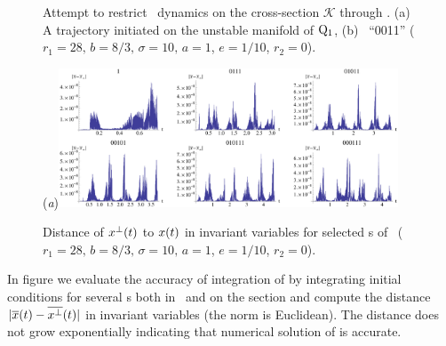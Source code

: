 {\begin{figure}[ht]
\begin{center}
\end{center}
\caption[\CLe\ desymmetrization with transverse integration]{
Attempt to restrict \CLe\ dynamics on the cross-section $\mathcal{K}$ through
. (a) A trajectory initiated on the unstable
manifold of $\mathrm{Q}_{1}$, (b) \rpo\ ``0011''
($r_1=28,\, b=8/3,\, \sigma=10,\, a=1$, $e=1/10$, $r_2=0$).
    }
\label{fig:CLEtransv}
\end{figure}

\begin{figure}[ht]
\begin{center}
  (\textit{a})\includegraphics[width=0.9\textwidth, clip=true]{../figs/CLEerrTransv}
\end{center}
\caption[Numerical error in \CLe\ desymmetrization with transverse integration]{
Distance of $x^\perp(t)$ to $x(t)$ in invariant variables 
for selected \rpo s of \CLe\,
($r_1=28,\, b=8/3,\, \sigma=10,\, a=1$, $e=1/10$, $r_2=0$).
    }
\label{fig:CLEerrTransv}
\end{figure}

In figure  we evaluate the accuracy of integration
of  by integrating initial conditions for several \rpo s 
both in \statesp\ and on the section and compute the distance 
$|\overline{x}(t)-\overline{x^\perp}(t)|$ in invariant variables  
(the norm is Euclidean).
The distance does not grow exponentially indicating that numerical solution
of  is accurate.

}%
